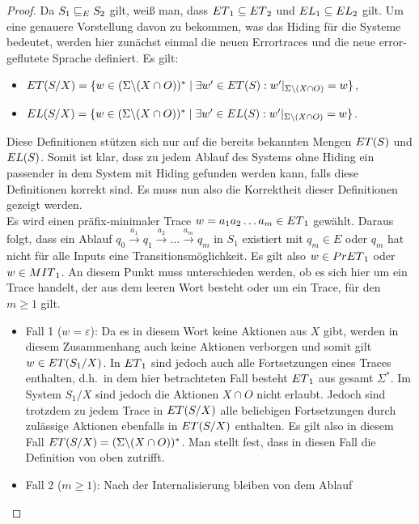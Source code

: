 \begin{proof}
  Da $S_1\sqsubseteq _E S_2$ gilt, weiß man, dass $ET{}_1\subseteq ET{}_2$ und
  $EL{}_1\subseteq EL{}_2$ gilt. Um eine genauere Vorstellung davon zu
  bekommen, was das Hiding für die Systeme bedeutet, werden hier zunächst
  einmal die neuen Errortraces und die neue error-geflutete Sprache definiert.
  Es gilt:
  \begin{itemize}
    \item $ET{}(S/X) = \{w\in (\Sigma\backslash (X\cap O))^*\mid \exists
      w'\in ET{}(S): w'|_{\Sigma\backslash (X\cap O)} = w\}$,
    \item $EL{}(S/X) = \{w\in (\Sigma\backslash (X\cap O))^*\mid \exists w'\in
      EL(S): w'|_{\Sigma\backslash (X\cap O)} = w\}$.
  \end{itemize}
  Diese Definitionen stützen sich nur auf die bereits bekannten Mengen
  $ET{}(S)$ und $EL{}(S)$. Somit ist klar, dass zu jedem Ablauf des Systems
  ohne Hiding ein passender in dem System mit Hiding gefunden werden kann,
  falls diese Definitionen korrekt sind. Es muss nun also die Korrektheit
  dieser Definitionen gezeigt werden.\\
  Es wird einen präfix-minimaler Trace $w=a_1a_2\dots a_m\in ET{}_1$ gewählt.
  Daraus folgt, dass ein Ablauf $q_0 \overset{a_1}{\rightarrow} q_1
  \overset{a_2}{\rightarrow} \dots \overset{a_m}{\rightarrow} q_m$ in $S_1$
  existiert mit $q_m\in E$ oder $q_m$ hat nicht für alle Inputs eine
  Transitionsmöglichkeit. Es gilt also $w\in PrET{}_1$ oder $w\in MIT{}_1$.
  An diesem Punkt muss unterschieden werden, ob es sich hier um ein Trace
  handelt, der aus dem leeren Wort besteht oder um ein Trace, für den $m\geq 1$
  gilt.
  \begin{itemize}
    \item Fall 1 ($w=\varepsilon$): Da es in diesem Wort keine Aktionen aus $X$
      gibt, werden in diesem Zusammenhang auch keine Aktionen verborgen und
      somit gilt $w\in ET{}(S_1/X)$. In $ET{}_1$ sind jedoch auch alle
      Fortsetzungen eines Traces enthalten, d.h.\ in dem hier betrachteten Fall
      besteht $ET{}_1$ aus gesamt $\Sigma ^*$. Im System $S_1/X$ sind jedoch
      die Aktionen $X\cap O$ nicht erlaubt. Jedoch sind trotzdem zu jedem
      Trace in $ET{}(S/X)$ alle beliebigen Fortsetzungen durch zulässige
      Aktionen ebenfalls in $ET{}(S/X)$ enthalten. Es gilt also in diesem Fall
      $ET{}(S/X) = (\Sigma\backslash (X\cap O))^*$. Man stellt fest, dass in
      diesen Fall die Definition von oben zutrifft.
    \item Fall 2 ($m\geq 1$): Nach der Internalisierung bleiben von dem Ablauf

\end{itemize}
\end{proof}
